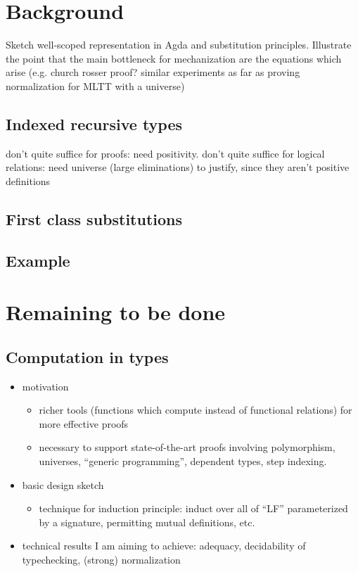 \documentclass{article}
\begin{document}
\section{Background}
Sketch well-scoped representation in Agda and substitution
principles. Illustrate the point that the main bottleneck for
mechanization are the equations which arise (e.g. church rosser proof?
similar experiments as far as proving normalization for MLTT with a universe)

\subsection{Indexed recursive types}

don't quite suffice for proofs: need positivity. don't quite suffice
for logical relations: need universe (large eliminations) to justify,
since they aren't positive definitions
\subsection{First class substitutions}

\subsection{Example}
\section{Remaining to be done}
\subsection{Computation in types}
\begin{itemize}
\item motivation
\begin{itemize}
\item richer tools (functions which compute instead of functional
relations) for more effective proofs
\item necessary to support state-of-the-art proofs involving polymorphism,
universes, ``generic programming'', dependent types, step indexing.
\end{itemize}
\item basic design sketch
\begin{itemize}
\item technique for induction principle: induct over all of ``LF''
parameterized by a signature, permitting mutual definitions, etc.
\end{itemize}
\item technical results I am aiming to achieve: adequacy, decidability
  of typechecking, (strong) normalization
\end{itemize}
\end{document}
